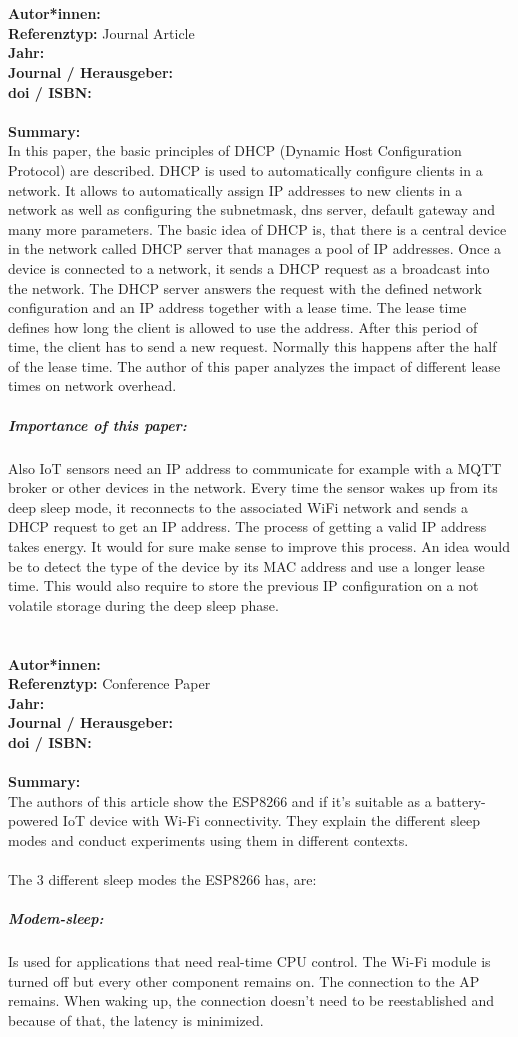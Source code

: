\documentclass{report}
\newcommand{\createConferencePaperHeader}[1]{
    {\let\clearpage\relax \chapter{\citetitle{#1}}}
    \noindent
    \textbf{Autor*innen:} \citeauthor{#1} \\
    \textbf{Referenztyp:} Conference Paper\\
    \textbf{Jahr:} \citeyear{#1} \\
    \textbf{Journal / Herausgeber:} \citelist{#1}{publisher}\\
    \textbf{doi / ISBN:} \citefield{#1}{doi} \\\\
    \textbf{Summary:}\\
}
\newcommand{\createJournalArticleHeader}[1]{
    {\let\clearpage\relax \chapter{\citetitle{#1}}}
    \noindent
    \textbf{Autor*innen:} \citeauthor{#1} \\
    \textbf{Referenztyp:} Journal Article\\
    \textbf{Jahr:} \citeyear{#1} \\
    \textbf{Journal / Herausgeber:} \citefield{#1}{journaltitle}\\
    \textbf{doi / ISBN:} \citefield{#1}{doi} \\\\
    \textbf{Summary:}\\
}
\begin{document}

\createJournalArticleHeader{li_how_2018}
In this paper, the basic principles of DHCP (Dynamic Host Configuration Protocol) are described. 
DHCP is used to automatically configure clients in a network. 
It allows to automatically assign IP addresses to new clients in a network as well as configuring the subnetmask, dns server, default gateway and many more parameters.
The basic idea of DHCP is, that there is a central device in the network called DHCP server that manages a pool of IP addresses.
Once a device is connected to a network, it sends a DHCP request as a broadcast into the network. 
The DHCP server answers the request with the defined network configuration and an IP address together with a lease time.
The lease time defines how long the client is allowed to use the address. After this period of time, the client has to send a new request. 
Normally this happens after the half of the lease time.
The author of this paper analyzes the impact of different lease times on network overhead.
\\
\paragraph{Importance of this paper:}
Also IoT sensors need an IP address to communicate for example with a MQTT broker or other devices in the network.
Every time the sensor wakes up from its deep sleep mode, it reconnects to the associated WiFi network and sends a DHCP request to get an IP address.
The process of getting a valid IP address takes energy. It would for sure make sense to improve this process. 
An idea would be to detect the type of the device by its MAC address and use a longer lease time. This would also require to store the previous IP configuration on a not volatile storage during the deep sleep phase.


\createConferencePaperHeader{mesquita_assessing_2018}
The authors of this article show the ESP8266 and if it's suitable as a battery-powered IoT device with Wi-Fi connectivity.
They explain the different sleep modes and conduct experiments using them in different contexts.\\\\
The 3 different sleep modes the ESP8266 has, are:\\
\paragraph{Modem-sleep:} Is used for applications that need real-time CPU control. The Wi-Fi module is turned off but every other component remains on. The connection to the AP remains. When waking up, the connection doesn't need to be reestablished and because of that, the latency is minimized.
\end{document}

